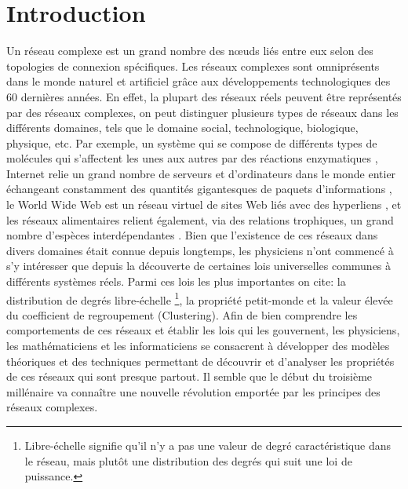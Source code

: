 %
%
\chapter*{Introduction}
Un réseau complexe est un grand nombre des nœuds liés entre eux selon des topologies de connexion spécifiques. Les réseaux complexes sont omniprésents dans le monde naturel et artificiel grâce aux développements technologiques des $60$ dernières années. En effet,  la plupart des réseaux réels peuvent être représentés par des réseaux complexes, on peut distinguer plusieurs types de réseaux dans les différents domaines, tels que le domaine social, technologique, biologique, physique, etc. Par exemple, un système qui se compose de différents types de molécules qui s'affectent les unes aux autres par des réactions enzymatiques \cite{Je-al2000}, Internet  relie un grand nombre de serveurs et d'ordinateurs dans le monde entier échangeant constamment des quantités gigantesques de paquets d'informations \cite{F-al1999}, le World Wide Web est un réseau virtuel de sites Web liés avec des hyperliens \cite{BA1999}, et les réseaux alimentaires relient également, via des relations trophiques, un grand nombre d'espèces interdépendantes \cite{Co-al1990,Pim-al2002}. Bien que l'existence de ces réseaux dans divers domaines était connue depuis longtemps, les physiciens n'ont commencé à s'y intéresser que depuis la découverte de certaines lois universelles communes à différents systèmes réels. Parmi ces lois les plus importantes on cite: 
\textsf{la distribution de degrés} libre-échelle \footnote{ Libre-échelle signifie qu'il n'y a pas une valeur de degré caractéristique dans le réseau, mais plutôt une distribution des degrés qui suit une loi de puissance.},
la propriété \textsf{petit-monde}  
et la valeur élevée du \textsf{coefficient de regroupement} (Clustering). Afin de bien comprendre les comportements de ces réseaux et établir les lois qui les gouvernent, les physiciens, les mathématiciens et les informaticiens se consacrent à développer des modèles théoriques et des techniques permettant de découvrir  et d'analyser les propriétés de ces réseaux qui sont presque partout. Il semble que le début du troisième millénaire va connaître une nouvelle révolution emportée par les principes des réseaux complexes.\\

